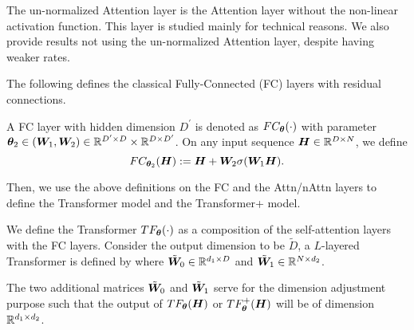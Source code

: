 \begin{remark}
    The un-normalized Attention layer is the Attention layer without the non-linear activation function. This layer is studied mainly for technical reasons. We also provide results not using the un-normalized Attention layer, despite having weaker rates. 
\end{remark}

The following defines the classical Fully-Connected (FC) layers with residual connections.
\begin{definition}[FC Layer] A FC layer with hidden dimension $D^\prime$ is denoted as $FC_{\boldsymbol{\theta}}(\cdot)$ with parameter $\boldsymbol{\theta}_2\in(\boldsymbol{W}_1,\boldsymbol{W}_2)\in\mathbb{R}^{D^\prime\times D}\times\mathbb{R}^{D\times D^\prime}$. On any input sequence $\boldsymbol{H}\in\mathbb{R}^{D\times N}$, we define
$$   FC_{\boldsymbol{\theta}_2}(\boldsymbol{H}):=\boldsymbol{H}+\boldsymbol{W}_2\sigma(\boldsymbol{W}_1\boldsymbol{H}).$$
\end{definition}
Then, we use the above definitions on the FC and the Attn/nAttn layers to define the Transformer model and the Transformer+ model.
\begin{definition}[Transformer]\label{transform}
    We define the Transformer $TF_{\boldsymbol{\theta}}(\cdot)$ as a composition of the self-attention layers with the FC layers. Consider the output dimension to be $\tilde D$, a $L$-layered Transformer is defined by  
    where $\tilde{\boldsymbol{W}}_0\in\mathbb{R}^{d_1\times D}$ and $\tilde{\boldsymbol{W}}_1\in\mathbb{R}^{N\times d_2}$.
\end{definition}
The two additional matrices $\tilde{\boldsymbol{W}}_0$ and $\tilde{\boldsymbol{W}}_1$ serve for the dimension adjustment purpose such that the output of $TF_{\boldsymbol{\theta}}(\boldsymbol{H})$ or $TF^+_{\boldsymbol{\theta}}(\boldsymbol{H})$ will be of dimension $\mathbb{R}^{d_1\times d_2}$.

